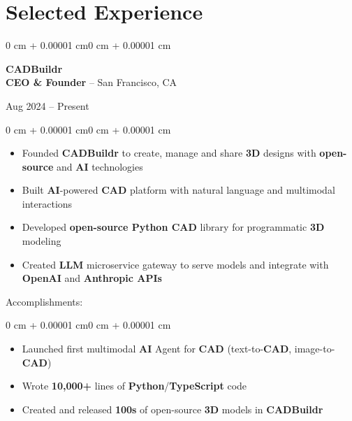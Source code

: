 \documentclass[10pt, letterpaper]{article}
\newenvironment{highlights}{
    \begin{itemize}[
        topsep=0.10 cm,
        parsep=0.10 cm,
        partopsep=0pt,
        itemsep=0pt,
        leftmargin=1.5 cm
    ]
}{
    \end{itemize}
}
\newenvironment{highlightsforbulletentries}{
    \begin{itemize}[
        topsep=0.10 cm,
        parsep=0.10 cm,
        partopsep=0pt,
        itemsep=0pt,
        leftmargin=1.5 cm
    ]
}{
    \end{itemize}
}
\newenvironment{onecolentry}{
    \begin{adjustwidth}{0 cm + 0.00001 cm}{0 cm + 0.00001 cm}
}{
    \end{adjustwidth}
}
\newenvironment{twocolentry}[2][]{
    \onecolentry
    \def\secondColumn{#2}
    \setcolumnwidth{\fill, 4.5 cm}
    \begin{paracol}{2}
}{
    \switchcolumn \raggedleft \secondColumn
    \end{paracol}
    \endonecolentry
}
\begin{document}
    \section{Selected Experience}
    \begin{twocolentry}{Aug 2024 -- Present}
        \textbf{CADBuildr} \\
        \textbf{CEO \& Founder} -- San Francisco, CA
    \end{twocolentry}
    \begin{onecolentry}
        \begin{highlights}
            \item Founded \textbf{CADBuildr} to create, manage and share \textbf{3D} designs with \textbf{open-source} and \textbf{AI} technologies
            \item Built \textbf{AI}-powered \textbf{CAD} platform with natural language and multimodal interactions
            \item Developed \textbf{open-source Python CAD} library for programmatic \textbf{3D} modeling
            \item Created \textbf{LLM} microservice gateway to serve models and integrate with \textbf{OpenAI} and \textbf{Anthropic APIs}
        \end{highlights}
    \end{onecolentry}

    Accomplishments:
    \begin{onecolentry}
        \begin{highlightsforbulletentries}
            \item Launched first multimodal \textbf{AI} Agent for \textbf{CAD} (text-to-\textbf{CAD}, image-to-\textbf{CAD})
            \item Wrote \textbf{10,000+} lines of \textbf{Python}/\textbf{TypeScript} code
            \item Created and released \textbf{100s} of open-source \textbf{3D} models in \textbf{CADBuildr}
        \end{highlightsforbulletentries}
    \end{onecolentry}

    \vspace{0.5cm}
\end{document}
